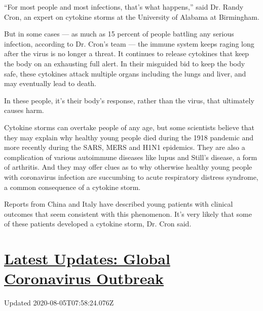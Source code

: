 ``For most people and most infections, that's what happens,'' said Dr.
Randy Cron, an expert on cytokine storms at the University of Alabama at
Birmingham.

But in some cases --- as much as 15 percent of people battling any
serious infection, according to Dr. Cron's team --- the immune system
keeps raging long after the virus is no longer a threat. It continues to
release cytokines that keep the body on an exhausting full alert. In
their misguided bid to keep the body safe, these cytokines attack
multiple organs including the lungs and liver, and may eventually lead
to death.

In these people, it's their body's response, rather than the virus, that
ultimately causes harm.

Cytokine storms can overtake people of any age, but some scientists
believe that they may explain why healthy young people died during the
1918 pandemic and more recently during the SARS, MERS and H1N1
epidemics. They are also a complication of various autoimmune diseases
like lupus and Still's disease, a form of arthritis. And they may offer
clues as to why otherwise healthy young people with coronavirus
infection are succumbing to acute respiratory distress syndrome, a
common consequence of a cytokine storm.

Reports from China and Italy have described young patients with clinical
outcomes that seem consistent with this phenomenon. It's very likely
that some of these patients developed a cytokine storm, Dr. Cron said.

\hypertarget{latest-updates-global-coronavirus-outbreak}{%
\section{\texorpdfstring{\href{https://www.nytimes.com/2020/08/04/world/coronavirus-cases.html?action=click\&pgtype=Article\&state=default\&region=MAIN_CONTENT_1\&context=storylines_live_updates}{Latest
Updates: Global Coronavirus
Outbreak}}{Latest Updates: Global Coronavirus Outbreak}}\label{latest-updates-global-coronavirus-outbreak}}

Updated 2020-08-05T07:58:24.076Z

